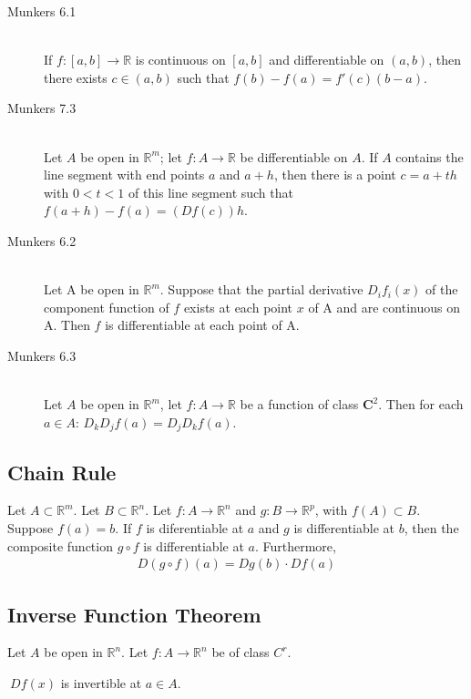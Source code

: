 \begin{description}
	\item[Munkers 6.1] \hfill \\
		If $f:[a,b] \to \mathbb{R}$ is continuous on $[a,b]$ and differentiable on $(a,b)$, then there exists $c \in (a,b)$ such that $f(b)-f(a) = f'(c)(b-a)$.

	\item[Munkers 7.3] \hfill \\
		Let $A$ be open in $\mathbb{R}^m$; let $f:A \to \mathbb{R}$ be differentiable on $A$. If $A$ contains the line segment with end points $a$ and $a+h$, then there is a point $c = a+th$ with $0 < t < 1$ of this line segment such that $f(a+h)-f(a) = (Df(c))h$.		

	\item[Munkers 6.2] \hfill \\
		Let A be open in $\mathbb{R}^m$.
		Suppose that the partial derivative
		$D_if_i(x)$ of the component function
		of $f$ exists at each point $x$ of A and are continuous on A.
		Then $f$ is differentiable at each point of A.
		
	\item[Munkers 6.3] \hfill \\
		Let $A$ be open in $\mathbb{R}^m$, let $f: A \to \mathbb{R}$
		be a function of class $\mathbf{C}^2$. Then for each $a\in A$:
		$D_kD_jf(a)=D_jD_kf(a)$.
\end{description}

\subsection{Chain Rule}
Let $A \subset \mathbb{R}^m$. Let $B \subset \mathbb{R}^n$.
Let $f : A \to \mathbb{R}^n$ and $g : B\to \mathbb{R}^p$, with $f(A) \subset B$. Suppose $f(a) = b$. If $f$ is diferentiable at $a$ and $g$ is differentiable at $b$, then the composite function $g \circ f$ is differentiable at $a$. Furthermore,
\begin{align*} 
D(g \circ f)(a) = Dg(b) \cdot Df(a)
\end{align*} 

\subsection{Inverse Function Theorem}
\label{thm_ivft}
Let $A$ be open in $\mathbb{R}^n$.
Let $f:A\to\mathbb{R}^n$ be of class $C^r$.

\thmIF
	$\ Df(x)$ is invertible at $a\in A$.
	
